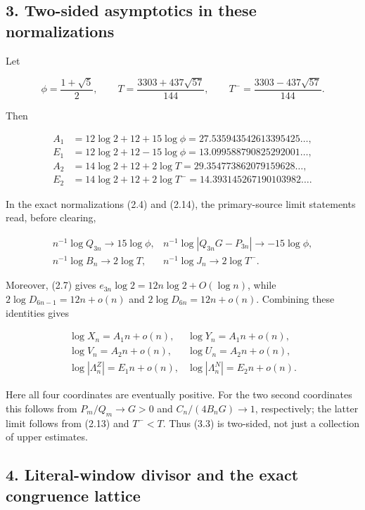 \documentclass[
  11pt,
]{article}
\begin{document}
\hypertarget{two-sided-asymptotics-in-these-normalizations}{%
\subsection{3. Two-sided asymptotics in these
normalizations}\label{two-sided-asymptotics-in-these-normalizations}}

Let

\[
 \phi=\frac{1+\sqrt5}{2},\qquad
 T=\frac{3303+437\sqrt{57}}{144},\qquad
 T^- =\frac{3303-437\sqrt{57}}{144}.
 \tag{3.1}
\]

Then

\[
 \begin{aligned}
 A_1&=12\log2+12+15\log\phi
       =27.535943542613395425\ldots,\\
 E_1&=12\log2+12-15\log\phi
       =13.099588790825292001\ldots,\\
 A_2&=14\log2+12+2\log T
       =29.354773862079159628\ldots,\\
 E_2&=14\log2+12+2\log T^-
       =14.393145267190103982\ldots.
 \end{aligned}
 \tag{3.2}
\]

In the exact normalizations (2.4) and (2.14), the primary-source limit
statements read, before clearing,

\[
\begin{array}{ll}
 n^{-1}\log Q_{3n}\to15\log\phi,&
 n^{-1}\log|Q_{3n}G-P_{3n}|\to-15\log\phi,\\
 n^{-1}\log B_n\to2\log T,&
 n^{-1}\log J_n\to2\log T^-.
\end{array}
\]

Moreover, (2.7) gives \(e_{3n}\log2=12n\log2+O(\log n)\), while
\(2\log D_{6n-1}=12n+o(n)\) and \(2\log D_{6n}=12n+o(n)\). Combining
these identities gives

\[
 \begin{array}{ll}
 \log X_n=A_1n+o(n),&\log Y_n=A_1n+o(n),\\
 \log V_n=A_2n+o(n),&\log U_n=A_2n+o(n),\\
 \log|\Lambda_n^Z|=E_1n+o(n),&
 \log|\Lambda_n^N|=E_2n+o(n).
 \end{array}
 \tag{3.3}
\]

Here all four coordinates are eventually positive. For the two second
coordinates this follows from \(P_m/Q_m\to G>0\) and
\(C_n/(4B_nG)\to1\), respectively; the latter limit follows from (2.13)
and \(T^-<T\). Thus (3.3) is two-sided, not just a collection of upper
estimates.

\hypertarget{literal-window-divisor-and-the-exact-congruence-lattice}{%
\subsection{4. Literal-window divisor and the exact congruence
lattice}\label{literal-window-divisor-and-the-exact-congruence-lattice}}
\end{document}

